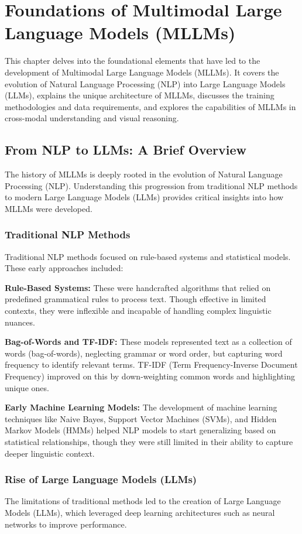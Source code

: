 \chapter{Foundations of Multimodal Large Language Models (MLLMs)}
This chapter delves into the foundational elements that have led to the development of Multimodal Large Language Models (MLLMs). It covers the evolution of Natural Language Processing (NLP) into Large Language Models (LLMs), explains the unique architecture of MLLMs, discusses the training methodologies and data requirements, and explores the capabilities of MLLMs in cross-modal understanding and visual reasoning.

\section{From NLP to LLMs: A Brief Overview}

The history of MLLMs is deeply rooted in the evolution of Natural Language Processing (NLP). Understanding this progression from traditional NLP methods to modern Large Language Models (LLMs) provides critical insights into how MLLMs were developed.

\subsection{Traditional NLP Methods}
Traditional NLP methods focused on rule-based systems and statistical models. These early approaches included:

\textbf{Rule-Based Systems:} These were handcrafted algorithms that relied on predefined grammatical rules to process text. Though effective in limited contexts, they were inflexible and incapable of handling complex linguistic nuances.

\textbf{Bag-of-Words and TF-IDF:} These models represented text as a collection of words (bag-of-words), neglecting grammar or word order, but capturing word frequency to identify relevant terms. TF-IDF (Term Frequency-Inverse Document Frequency) improved on this by down-weighting common words and highlighting unique ones.

\textbf{Early Machine Learning Models:} The development of machine learning techniques like Naive Bayes, Support Vector Machines (SVMs), and Hidden Markov Models (HMMs) helped NLP models to start generalizing based on statistical relationships, though they were still limited in their ability to capture deeper linguistic context.

\subsection{Rise of Large Language Models (LLMs)}
The limitations of traditional methods led to the creation of Large Language Models (LLMs), which leveraged deep learning architectures such as neural networks to improve performance.

